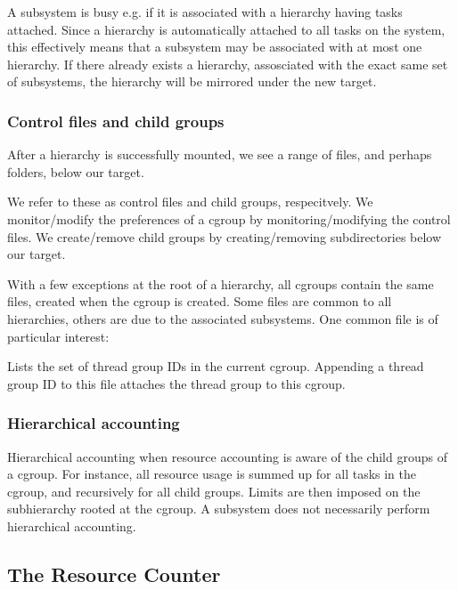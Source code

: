 A subsystem is busy e.g. if it is associated with a hierarchy having tasks
attached.  Since a hierarchy is automatically attached to all tasks on the
system, this effectively means that a subsystem may be associated with at most
one hierarchy. If there already exists a hierarchy, assosciated with the exact
same set of subsystems, the hierarchy will be mirrored under the new target.

\subsubsection{Control files and child groups}

After a hierarchy is successfully mounted, we see a range of files, and perhaps
folders, below our target.

We refer to these as control files and child groups, respecitvely. We
monitor/modify the preferences of a cgroup by monitoring/modifying the control
files. We create/remove child groups by creating/removing subdirectories below
our target.

With a few exceptions at the root of a hierarchy, all cgroups contain the same
files, created when the cgroup is created. Some files are common to all
hierarchies, others are due to the associated subsystems. One common file is of
particular interest:

\begin{description}[\setleftmargin{0.2in}\breaklabel\setlabelstyle{\tt}]

\item [cgroup.procs] Lists the set of thread group IDs in the current cgroup.
Appending a thread group ID to this file attaches the thread group to this
cgroup.

\end{description}

\subsubsection{Hierarchical accounting}

Hierarchical accounting when resource accounting is aware of the child groups
of a cgroup.  For instance, all resource usage is summed up for all tasks in
the cgroup, and recursively for all child groups.  Limits are then imposed on
the subhierarchy rooted at the cgroup. A subsystem does not necessarily perform
hierarchical accounting.

\subsection{The Resource Counter}

